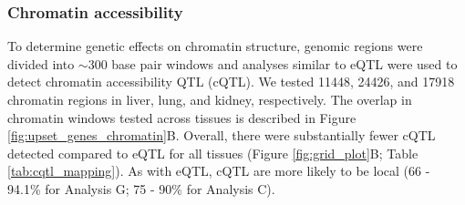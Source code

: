 \documentclass[9pt,twocolumn,twoside]{gsajnl}
\newcommand{\eg}{\emph{e.g.}\xspace}
\newcommand{\WV}[2]{\textcolor{red}{#1\footnote{\textcolor{red}{WV: #2}}}}
\newcommand{\WVinline}[1]{\textcolor{red}{#1}}
\begin{document}
\subsubsection{Chromatin accessibility}
To determine genetic effects on chromatin structure, genomic regions were divided into $\sim$300 base pair windows and analyses similar to eQTL were used to detect chromatin accessibility QTL (cQTL). We tested 11448, 24426, and 17918 chromatin regions in liver, lung, and kidney, respectively. The overlap in chromatin windows tested across tissues is described in Figure \ref{fig:upset_genes_chromatin}B. Overall, there were substantially fewer cQTL detected compared to eQTL for all tissues (Figure \ref{fig:grid_plot}B; Table \ref{tab:cqtl_mapping}). As with eQTL, cQTL are more likely to be local (66 - 94.1\% for Analysis G; 75 - 90\% for Analysis C).


\end{document}
